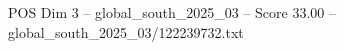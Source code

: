 \begin{textsample}{POS Dim 3 – global\_south\_2025\_03 – Score 33.00 – global\_south\_2025\_03/122239732.txt}
\end{textsample}
